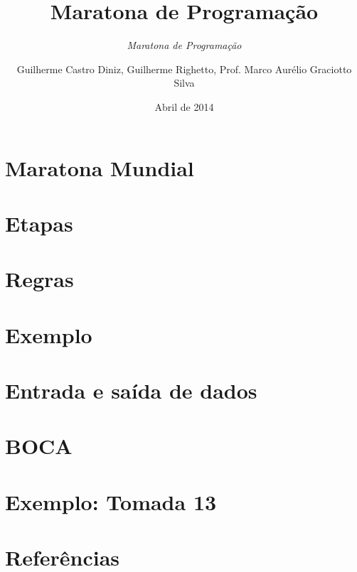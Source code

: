 \documentclass[utf8, usepdftitle=false, svgnames, color={table,
fixpdftex, hyperref, fixinclude, xcdraw}, t, brazil]{beamer}
\title{\large Maratona de Programação}
\subtitle{\textit{Maratona de Programação}}
\author[UTFPR-CM]{Guilherme Castro Diniz, Guilherme Righetto, Prof. Marco Aurélio Graciotto Silva}
\date[]{Abril de 2014}
\begin{document}
 \section{Maratona Mundial}
 
 
 \section{Etapas}
 
 
 \section{Regras}
 
 
 \section{Exemplo}
 

 \section{Entrada e saída de dados}
 
 
 \section{BOCA}
 
 
 \section{Exemplo: Tomada 13}
 
 
 \section{Referências}
 
\end{document}
